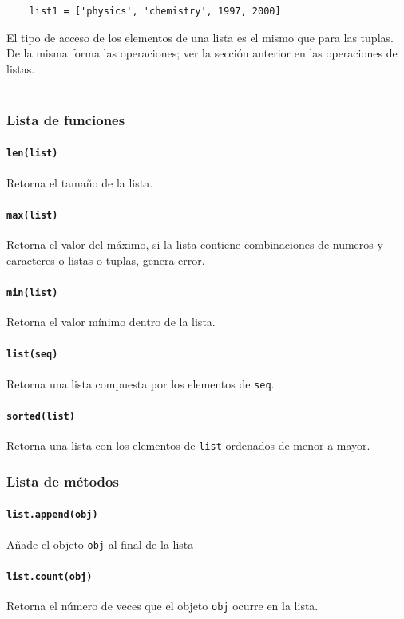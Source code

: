 \begin{verbatim}
    list1 = ['physics', 'chemistry', 1997, 2000]
\end{verbatim}

El tipo de acceso de los elementos de una lista es el mismo que para las tuplas. De la misma forma las operaciones; ver la sección anterior en las operaciones de listas. \\\

\subsubsection{Lista de funciones}

\paragraph{\texttt{len(list)}} Retorna el tamaño de la lista.
\paragraph{\texttt{max(list)}} Retorna el valor del máximo, si la lista contiene combinaciones de numeros y caracteres o listas o tuplas, genera error.
\paragraph{\texttt{min(list)}} Retorna el valor mínimo dentro de la lista.
\paragraph{\texttt{list(seq)}} Retorna una lista compuesta por los elementos de \texttt{seq}.
\paragraph{\texttt{sorted(list)}} Retorna una lista con los elementos de \texttt{list} ordenados de menor a mayor.


\subsubsection{Lista de métodos}

\paragraph{\texttt{list.append(obj)}} Añade el objeto \texttt{obj} al final de la lista

\paragraph{\texttt{list.count(obj)}} Retorna el número de veces que el objeto \texttt{obj} ocurre en la lista.

